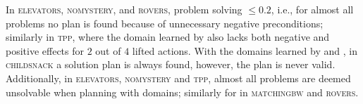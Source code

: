 In \textsc{elevators, nomystery,} and \textsc{rovers}, \samshort problem solving $\le 0.2$, i.e., for almost all problems no plan is found because of unnecessary negative preconditions; similarly in \textsc{tpp}, where the domain learned by \samshort also lacks both negative and positive effects for $2$ out of $4$ lifted actions.  
%
%
%
%
With the domains learned by \rosame and \nolam, in \textsc{childsnack} a solution plan is always found, however, the plan is never valid. 
Additionally, in \textsc{elevators, nomystery} and \textsc{tpp}, almost all problems are deemed unsolvable when planning with \nolam domains; similarly for \rosame in \textsc{matchingbw} and \textsc{rovers}.

